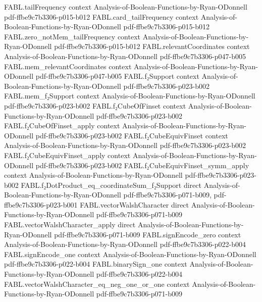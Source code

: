 \begin{theorem}
\proofstep
  {FABL.tailFrequency}
  {context}
  {Analysis-of-Boolean-Functions-by-Ryan-ODonnell}
  {pdf-ffbe9c7b3306-p015-b012}
\proofstep
  {FABL.card_tailFrequency}
  {context}
  {Analysis-of-Boolean-Functions-by-Ryan-ODonnell}
  {pdf-ffbe9c7b3306-p015-b012}
\proofstep
  {FABL.zero_notMem_tailFrequency}
  {context}
  {Analysis-of-Boolean-Functions-by-Ryan-ODonnell}
  {pdf-ffbe9c7b3306-p015-b012}
\proofstep
  {FABL.relevantCoordinates}
  {context}
  {Analysis-of-Boolean-Functions-by-Ryan-ODonnell}
  {pdf-ffbe9c7b3306-p047-b005}
\proofstep
  {FABL.mem_relevantCoordinates}
  {context}
  {Analysis-of-Boolean-Functions-by-Ryan-ODonnell}
  {pdf-ffbe9c7b3306-p047-b005}
\proofstep
  {FABL.f₂Support}
  {context}
  {Analysis-of-Boolean-Functions-by-Ryan-ODonnell}
  {pdf-ffbe9c7b3306-p023-b002}
\proofstep
  {FABL.mem_f₂Support}
  {context}
  {Analysis-of-Boolean-Functions-by-Ryan-ODonnell}
  {pdf-ffbe9c7b3306-p023-b002}
\proofstep
  {FABL.f₂CubeOfFinset}
  {context}
  {Analysis-of-Boolean-Functions-by-Ryan-ODonnell}
  {pdf-ffbe9c7b3306-p023-b002}
\proofstep
  {FABL.f₂CubeOfFinset_apply}
  {context}
  {Analysis-of-Boolean-Functions-by-Ryan-ODonnell}
  {pdf-ffbe9c7b3306-p023-b002}
\proofstep
  {FABL.f₂CubeEquivFinset}
  {context}
  {Analysis-of-Boolean-Functions-by-Ryan-ODonnell}
  {pdf-ffbe9c7b3306-p023-b002}
\proofstep
  {FABL.f₂CubeEquivFinset_apply}
  {context}
  {Analysis-of-Boolean-Functions-by-Ryan-ODonnell}
  {pdf-ffbe9c7b3306-p023-b002}
\proofstep
  {FABL.f₂CubeEquivFinset_symm_apply}
  {context}
  {Analysis-of-Boolean-Functions-by-Ryan-ODonnell}
  {pdf-ffbe9c7b3306-p023-b002}
\proofstep
  {FABL.f₂DotProduct_eq_coordinateSum_f₂Support}
  {direct}
  {Analysis-of-Boolean-Functions-by-Ryan-ODonnell}
  {pdf-ffbe9c7b3306-p071-b009,
    pdf-ffbe9c7b3306-p023-b001}
\proofstep
  {FABL.vectorWalshCharacter}
  {direct}
  {Analysis-of-Boolean-Functions-by-Ryan-ODonnell}
  {pdf-ffbe9c7b3306-p071-b009}
\proofstep
  {FABL.vectorWalshCharacter_apply}
  {direct}
  {Analysis-of-Boolean-Functions-by-Ryan-ODonnell}
  {pdf-ffbe9c7b3306-p071-b009}
\proofstep
  {FABL.signEncode_zero}
  {context}
  {Analysis-of-Boolean-Functions-by-Ryan-ODonnell}
  {pdf-ffbe9c7b3306-p022-b004}
\proofstep
  {FABL.signEncode_one}
  {context}
  {Analysis-of-Boolean-Functions-by-Ryan-ODonnell}
  {pdf-ffbe9c7b3306-p022-b004}
\proofstep
  {FABL.binarySign_one}
  {context}
  {Analysis-of-Boolean-Functions-by-Ryan-ODonnell}
  {pdf-ffbe9c7b3306-p022-b004}
\proofstep
  {FABL.vectorWalshCharacter_eq_neg_one_or_one}
  {context}
  {Analysis-of-Boolean-Functions-by-Ryan-ODonnell}
  {pdf-ffbe9c7b3306-p071-b009}

\end{theorem}
